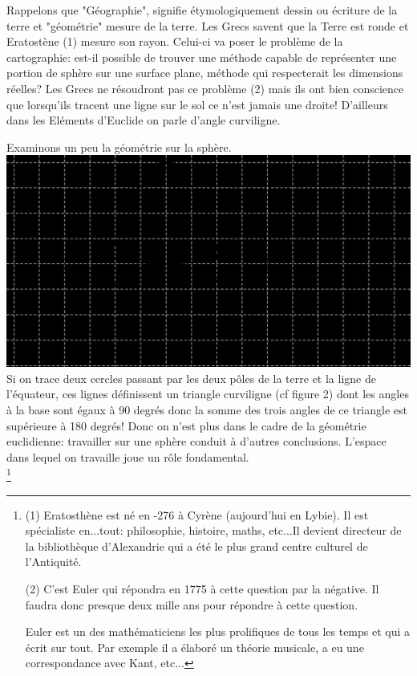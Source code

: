 \documentclass[a4paper, 12pt, twoside]{book}
\begin{document}
    
     
   
   
   
   Rappelons que "Géographie",
    signifie étymologiquement dessin ou écriture de la terre et  "géométrie" mesure de la terre. Les Grecs savent que la Terre est ronde et Eratostène (1) mesure son rayon. Celui-ci va  poser le problème de la cartographie: est-il possible de trouver une méthode capable de représenter une portion de sphère sur une surface plane, méthode qui respecterait les dimensions réelles? Les Grecs ne résoudront pas ce problème (2) mais ils ont bien conscience que lorsqu'ils tracent une ligne sur le sol ce n'est jamais une droite! D'ailleurs dans les Eléments d'Euclide on parle d'angle curviligne.\
    
     Examinons un peu la géométrie sur la sphère.\\
    

  \includegraphics[scale=0.7]{figures/neuc.eps}\\
  
  
  Si on trace deux cercles passant par les deux pôles de la terre et la ligne de l'équateur, ces lignes définissent un triangle curviligne (cf figure 2) dont les angles à la base sont égaux à 90 degrés donc la somme des trois angles de ce triangle est supérieure à 180 degrés! Donc on n'est plus dans le cadre de la géométrie euclidienne: travailler sur une sphère conduit à d'autres conclusions. L'espace dans lequel on travaille joue un rôle fondamental.\\
 
  



  
  
   \footnote{(1) Eratosthène est né en -276 à Cyrène (aujourd'hui en Lybie). Il est spécialiste en...tout: philosophie, histoire, maths, etc...Il devient directeur de la bibliothèque d'Alexandrie qui a été le plus grand centre culturel de l'Antiquité.

(2) C'est Euler qui répondra en 1775 à cette question par la négative. Il faudra donc presque deux mille ans pour répondre à cette question. \

Euler est un des mathématiciens les plus prolifiques de tous les temps et qui  a écrit sur  tout. Par exemple il a élaboré un théorie musicale, a eu une correspondance avec Kant, etc...  }  
  
\end{document}
